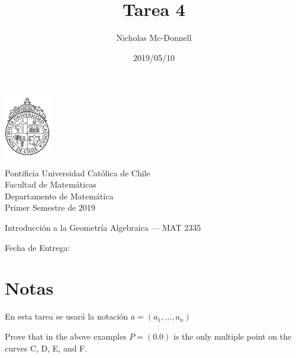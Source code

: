 

\title{Tarea 4}
\author{Nicholas Mc-Donnell}
\date{2019/05/10}



\begin{minipage}{2.5cm}
    \includegraphics[width=2cm]{../../figures/logo1.jpg}
\end{minipage}
\begin{minipage}{13cm}
    \begin{flushleft}
        \raggedright{
            \noindent
            {\sc Pontificia Universidad Católica de Chile\\
                Facultad de Matemáticas\\
                Departamento de Matemática} \smallskip \\
            Primer Semestre de 2019\\
        }
    \end{flushleft}
\end{minipage}

\vspace{2ex}
{\Large \centerline{\bf \thetitle}}
{\large \centerline{Introducción a la Geometría Algebraica --- MAT 2335}}
{\normalsize \centerline{ Fecha de Entrega: \thedate}}
\vfill

\begin{flushright}
    {\large\theauthor}
\end{flushright}
\newpage
\normalsize
{}
\tableofcontents
\newpage

\section*{Notas}
En esta tarea se usará la notación \(\overline{a}=(a_1,\dots ,a_n)\)\\

\begin{prob}{3.1}
    Prove that in the above examples \(P=(0.0)\) is the only multiple point on the curves C, D, E, and F.
\end{prob}

